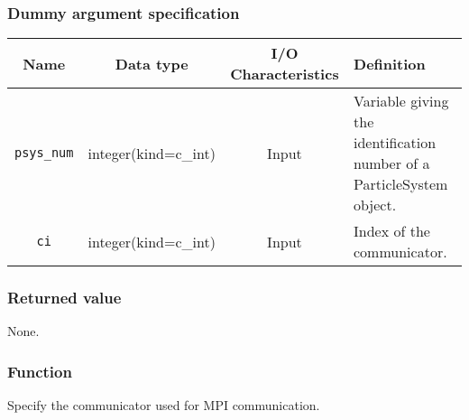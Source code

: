 \subsubsection*{Dummy argument specification}
\begin{table}[h]
\begin{tabularx}{\linewidth}{cccX}
\toprule
\rowcolor{Snow2}
Name & Data type & I/O Characteristics & Definition \\
\midrule
\texttt{psys\_num} & integer(kind=c\_int) & Input &  Variable giving the identification number of a ParticleSystem object.\\
\texttt{ci} & integer(kind=c\_int) & Input & Index of the communicator.\\
\bottomrule
\end{tabularx}
\end{table}

\subsubsection*{Returned value}
None.

\subsubsection*{Function}

Specify the communicator used for MPI communication.

\clearpage
